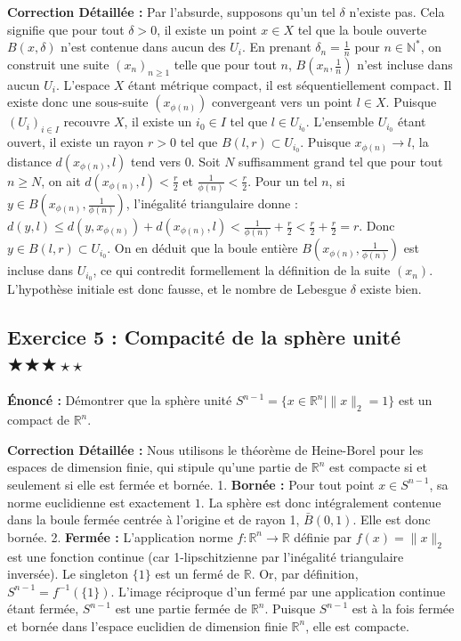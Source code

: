 \documentclass[11pt,a4paper]{article}
\begin{document}
\textbf{Correction Détaillée :}
Par l'absurde, supposons qu'un tel $\delta$ n'existe pas.
Cela signifie que pour tout $\delta > 0$, il existe un point $x \in X$ tel que la boule ouverte $B(x, \delta)$ n'est contenue dans aucun des $U_i$.
En prenant $\delta_n = \frac{1}{n}$ pour $n \in \mathbb{N}^*$, on construit une suite $(x_n)_{n \ge 1}$ telle que pour tout $n$, $B(x_n, \frac{1}{n})$ n'est incluse dans aucun $U_i$.
L'espace $X$ étant métrique compact, il est séquentiellement compact. Il existe donc une sous-suite $(x_{\phi(n)})$ convergeant vers un point $l \in X$.
Puisque $(U_i)_{i \in I}$ recouvre $X$, il existe un $i_0 \in I$ tel que $l \in U_{i_0}$.
L'ensemble $U_{i_0}$ étant ouvert, il existe un rayon $r > 0$ tel que $B(l, r) \subset U_{i_0}$.
Puisque $x_{\phi(n)} \to l$, la distance $d(x_{\phi(n)}, l)$ tend vers 0. Soit $N$ suffisamment grand tel que pour tout $n \ge N$, on ait $d(x_{\phi(n)}, l) < \frac{r}{2}$ et $\frac{1}{\phi(n)} < \frac{r}{2}$.
Pour un tel $n$, si $y \in B\left(x_{\phi(n)}, \frac{1}{\phi(n)}\right)$, l'inégalité triangulaire donne :
$d(y, l) \le d(y, x_{\phi(n)}) + d(x_{\phi(n)}, l) < \frac{1}{\phi(n)} + \frac{r}{2} < \frac{r}{2} + \frac{r}{2} = r$.
Donc $y \in B(l, r) \subset U_{i_0}$.
On en déduit que la boule entière $B\left(x_{\phi(n)}, \frac{1}{\phi(n)}\right)$ est incluse dans $U_{i_0}$, ce qui contredit formellement la définition de la suite $(x_n)$.
L'hypothèse initiale est donc fausse, et le nombre de Lebesgue $\delta$ existe bien.

\subsection*{Exercice 5 : Compacité de la sphère unité \quad $\bigstar\bigstar\bigstar\star\star$}

\textbf{Énoncé :} Démontrer que la sphère unité $S^{n-1} = \{x \in \mathbb{R}^n \mid \|x\|_2 = 1\}$ est un compact de $\mathbb{R}^n$.

\textbf{Correction Détaillée :}
Nous utilisons le théorème de Heine-Borel pour les espaces de dimension finie, qui stipule qu'une partie de $\mathbb{R}^n$ est compacte si et seulement si elle est fermée et bornée.
1. \textbf{Bornée :} Pour tout point $x \in S^{n-1}$, sa norme euclidienne est exactement $1$. La sphère est donc intégralement contenue dans la boule fermée centrée à l'origine et de rayon 1, $\bar{B}(0, 1)$. Elle est donc bornée.
2. \textbf{Fermée :} L'application norme $f : \mathbb{R}^n \to \mathbb{R}$ définie par $f(x) = \|x\|_2$ est une fonction continue (car 1-lipschitzienne par l'inégalité triangulaire inversée).
Le singleton $\{1\}$ est un fermé de $\mathbb{R}$.
Or, par définition, $S^{n-1} = f^{-1}(\{1\})$. L'image réciproque d'un fermé par une application continue étant fermée, $S^{n-1}$ est une partie fermée de $\mathbb{R}^n$.
Puisque $S^{n-1}$ est à la fois fermée et bornée dans l'espace euclidien de dimension finie $\mathbb{R}^n$, elle est compacte.
\end{document}
